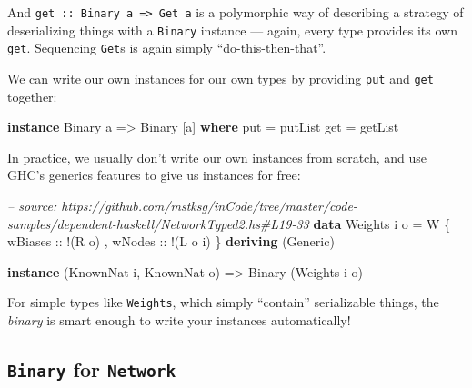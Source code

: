 \documentclass[]{article}
\newenvironment{Shaded}{}{}
\newcommand{\KeywordTok}[1]{\textcolor[rgb]{0.00,0.44,0.13}{\textbf{{#1}}}}
\newcommand{\DataTypeTok}[1]{\textcolor[rgb]{0.56,0.13,0.00}{{#1}}}
\newcommand{\CommentTok}[1]{\textcolor[rgb]{0.38,0.63,0.69}{\textit{{#1}}}}
\newcommand{\OtherTok}[1]{\textcolor[rgb]{0.00,0.44,0.13}{{#1}}}
\newcommand{\FunctionTok}[1]{\textcolor[rgb]{0.02,0.16,0.49}{{#1}}}
\newcommand{\NormalTok}[1]{{#1}}
\begin{document}
And \texttt{get\ ::\ Binary\ a\ =\textgreater{}\ Get\ a} is a polymorphic way of
describing a strategy of deserializing things with a \texttt{Binary} instance
--- again, every type provides its own \texttt{get}. Sequencing \texttt{Get}s is
again simply ``do-this-then-that''.

We can write our own instances for our own types by providing \texttt{put} and
\texttt{get} together:

\begin{Shaded}
\begin{Highlighting}[]
\KeywordTok{instance} \DataTypeTok{Binary} \NormalTok{a }\OtherTok{=>} \DataTypeTok{Binary} \NormalTok{[a] }\KeywordTok{where}
    \NormalTok{put }\FunctionTok{=} \NormalTok{putList}
    \NormalTok{get }\FunctionTok{=} \NormalTok{getList}
\end{Highlighting}
\end{Shaded}

In practice, we usually don't write our own instances from scratch, and use
GHC's generics features to give us instances for free:

\begin{Shaded}
\begin{Highlighting}[]
\CommentTok{-- source: https://github.com/mstksg/inCode/tree/master/code-samples/dependent-haskell/NetworkTyped2.hs#L19-33}
\KeywordTok{data} \DataTypeTok{Weights} \NormalTok{i o }\FunctionTok{=} \DataTypeTok{W} \NormalTok{\{}\OtherTok{ wBiases ::} \FunctionTok{!}\NormalTok{(}\DataTypeTok{R} \NormalTok{o)}
                     \NormalTok{,}\OtherTok{ wNodes  ::} \FunctionTok{!}\NormalTok{(}\DataTypeTok{L} \NormalTok{o i)}
                     \NormalTok{\}}
  \KeywordTok{deriving} \NormalTok{(}\DataTypeTok{Generic}\NormalTok{)}

\KeywordTok{instance} \NormalTok{(}\DataTypeTok{KnownNat} \NormalTok{i, }\DataTypeTok{KnownNat} \NormalTok{o) }\OtherTok{=>} \DataTypeTok{Binary} \NormalTok{(}\DataTypeTok{Weights} \NormalTok{i o)}
\end{Highlighting}
\end{Shaded}

For simple types like \texttt{Weights}, which simply ``contain'' serializable
things, the \emph{binary} is smart enough to write your instances automatically!

\subsection{\texorpdfstring{\texttt{Binary} for
\texttt{Network}}{Binary for Network}}\label{binary-for-network}
\end{document}
